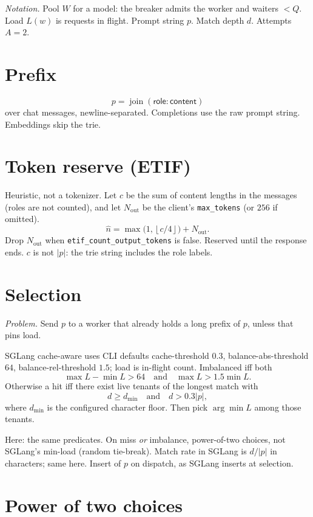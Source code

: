 \documentclass[journal,onecolumn]{IEEEtran}
\begin{document}
\noindent\textit{Notation.}
Pool $W$ for a model: the breaker admits the worker and waiters $<Q$.
Load $L(w)$ is requests in flight. Prompt string $p$. Match depth $d$.
Attempts $A=2$.

\section{Prefix}

\[
p=\operatorname{join}(\mathsf{role}:\mathsf{content})
\]
over chat messages, newline-separated. Completions use the raw prompt
string. Embeddings skip the trie.

\section{Token reserve (ETIF)}

Heuristic, not a tokenizer. Let $c$ be the sum of content lengths in the
messages (roles are not counted), and let $N_{\mathrm{out}}$ be the
client's \texttt{max\_tokens} (or $256$ if omitted).
\[
\hat{n}=\max\bigl(1,\left\lfloor c/4\right\rfloor\bigr)+N_{\mathrm{out}}.
\]
Drop $N_{\mathrm{out}}$ when \texttt{etif\_count\_output\_tokens} is
false. Reserved until the response ends. $c$ is not $|p|$: the trie
string includes the role labels.

\section{Selection}

\emph{Problem.} Send $p$ to a worker that already holds a long prefix of
$p$, unless that pins load.

SGLang cache-aware uses CLI defaults cache-threshold $0.3$,
balance-abs-threshold $64$, balance-rel-threshold $1.5$; load is
in-flight count. Imbalanced iff both
\[
\max L-\min L>64
\quad\text{and}\quad
\max L>1.5\min L.
\]
Otherwise a hit iff there exist live tenants of the longest match with
\[
d\ge d_{\min}
\quad\text{and}\quad
d>0.3|p|,
\]
where $d_{\min}$ is the configured character floor. Then pick
$\arg\min L$ among those tenants.

Here: the same predicates. On miss \emph{or} imbalance, power-of-two
choices, not SGLang's min-load (random tie-break). Match rate in SGLang is
$d/|p|$ in characters; same here. Insert of $p$ on dispatch, as SGLang
inserts at selection.

\section{Power of two choices}
\end{document}

